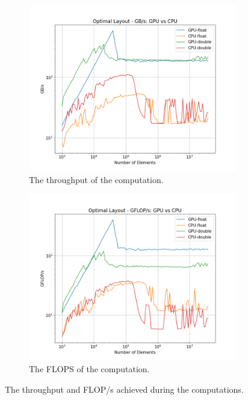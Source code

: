 \documentclass[10pt]{article}
\begin{document}
\begin{figure}[!ht]
    \centering
    \begin{subfigure}[b]{0.49\textwidth}
        \centering
        \includegraphics[width=\linewidth]{figs/best_both_gbps.png}
        \caption{The throughput of the computation.}
        \label{fig:best_both_gbps}
    \end{subfigure}\hfill
    \begin{subfigure}[b]{0.49\textwidth}
        \centering
        \includegraphics[width=\linewidth]{figs/best_both_gflops.png}
        \caption{The FLOPS of the computation.}
        \label{fig:best_both_gflops}
    \end{subfigure}\hfill
    \caption{The throughput and FLOP/s achieved during the computations.}
    \label{fig:best_gbps_and_flops}
\end{figure}
\end{document}
